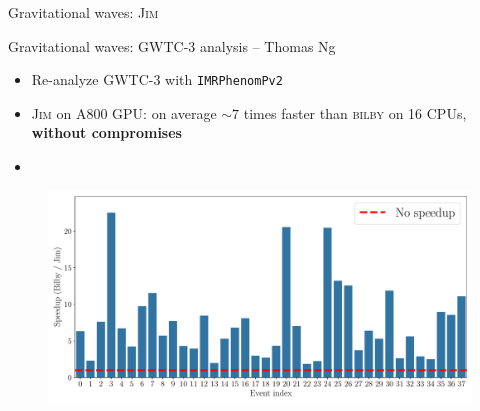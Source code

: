 \documentclass[usenames,dvipsnames,t]{beamer}
\begin{document}
\begin{frame}{Gravitational waves: \textsc{Jim}}

\end{frame}

\begin{frame}{Gravitational waves: GWTC-3 analysis -- Thomas Ng}

  \begin{itemize}
    \item Re-analyze GWTC-3 with \texttt{IMRPhenomPv2}

    \item \textsc{Jim} on A800 GPU: on average $\sim 7$ times faster than \textsc{bilby} on 16 CPUs, \textbf{without compromises}
    
    \item {}
  \end{itemize}

  \vspace{2mm}

  \begin{figure}
    \centering
    \includegraphics[width=0.90\linewidth]{Figures/speedup_NVIDIA_A800-SXM4-80GB.pdf}
  \end{figure}
  
\end{frame}
\end{document}
